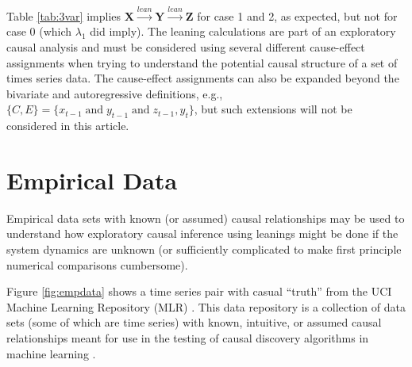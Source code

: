 \documentclass[twocolumn,aps,pre,groupedaddress]{revtex4-1}
\begin{document}
Table \ref{tab:3var} implies $\mathbf{X}\xrightarrow{lean}\mathbf{Y}\xrightarrow{lean}\mathbf{Z}$ for case 1 and 2, as expected, but not for case 0 (which $\lambda_1$ did imply).  The leaning calculations are part of an exploratory causal analysis and must be considered using several different cause-effect assignments when trying to understand the potential causal structure of a set of times series data.  The cause-effect assignments can also be expanded beyond the bivariate and autoregressive definitions, e.g., $\{C,E\} = \{x_{t-1}\;\mathrm{ and }\;y_{t-1}\;\mathrm{ and }\;z_{t-1},y_t\}$, but such extensions will not be considered in this article.

\section{Empirical Data}
Empirical data sets with known (or assumed) causal relationships may be used to understand how exploratory causal inference using leanings might be done if the system dynamics are unknown (or sufficiently complicated to make first principle numerical comparisons cumbersome).

Figure \ref{fig:empdata} shows a time series pair with casual ``truth'' from the UCI Machine Learning Repository (MLR) \cite{bache2013}.  This data repository is a collection of data sets (some of which are time series) with known, intuitive, or assumed causal relationships meant for use in the testing of causal discovery algorithms in machine learning \cite{bache2013}.  
\end{document}

